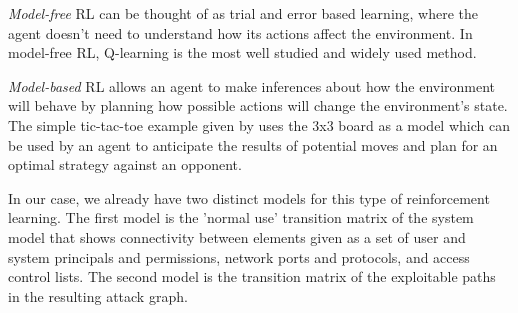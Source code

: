 \textit{Model-free} RL can be thought of as trial and error based learning, where the agent doesn't need to understand how its actions affect the environment. In model-free RL, Q-learning is the most well studied and widely used method\cite{Boutaba_2018}. 

\textit{Model-based} RL allows an agent to make inferences about how the environment will behave by planning how possible actions will change the environment's state. The simple tic-tac-toe example given by \cite{Sutton_Barto_2018} uses the 3x3 board as a model which can be used by an agent to anticipate the results of potential moves and plan for an optimal strategy against an opponent. 

In our case, we already have two distinct models for this type of reinforcement learning. The first model is the 'normal use' transition matrix of the system model that shows connectivity between elements given as a set of user and system principals and permissions, network ports and protocols, and access control lists. The second model is the transition matrix of the exploitable paths in the resulting attack graph.    